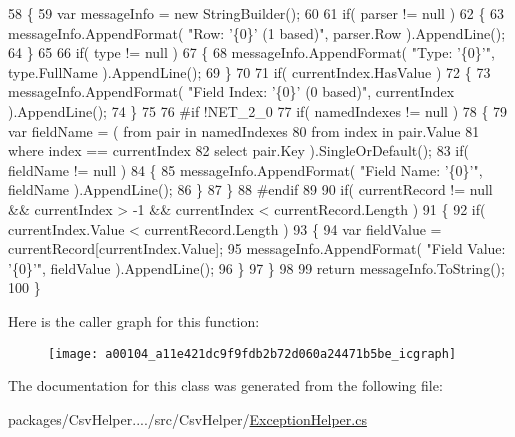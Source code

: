 \begin{DoxyCode}
58         \{
59             var messageInfo = \textcolor{keyword}{new} StringBuilder();
60 
61             \textcolor{keywordflow}{if}( parser != null )
62             \{
63                 messageInfo.AppendFormat( \textcolor{stringliteral}{"Row: '\{0\}' (1 based)"}, parser.Row ).AppendLine();
64             \}
65 
66             \textcolor{keywordflow}{if}( type != null )
67             \{
68                 messageInfo.AppendFormat( \textcolor{stringliteral}{"Type: '\{0\}'"}, type.FullName ).AppendLine();
69             \}
70 
71             \textcolor{keywordflow}{if}( currentIndex.HasValue )
72             \{
73                 messageInfo.AppendFormat( \textcolor{stringliteral}{"Field Index: '\{0\}' (0 based)"}, currentIndex ).AppendLine();
74             \}
75 
76 \textcolor{preprocessor}{#if !NET\_2\_0
}
77 \textcolor{preprocessor}{}            \textcolor{keywordflow}{if}( namedIndexes != null )
78             \{
79                 var fieldName = ( from pair in namedIndexes
80                                   from index in pair.Value
81                                   where index == currentIndex
82                                   select pair.Key ).SingleOrDefault();
83                 \textcolor{keywordflow}{if}( fieldName != null )
84                 \{
85                     messageInfo.AppendFormat( \textcolor{stringliteral}{"Field Name: '\{0\}'"}, fieldName ).AppendLine();
86                 \}
87             \}
88 \textcolor{preprocessor}{#endif
}
89 \textcolor{preprocessor}{}
90             \textcolor{keywordflow}{if}( currentRecord != null && currentIndex > -1 && currentIndex < currentRecord.Length )
91             \{
92                 \textcolor{keywordflow}{if}( currentIndex.Value < currentRecord.Length )
93                 \{
94                     var fieldValue = currentRecord[currentIndex.Value];
95                     messageInfo.AppendFormat( \textcolor{stringliteral}{"Field Value: '\{0\}'"}, fieldValue ).AppendLine();
96                 \}
97             \}
98 
99             \textcolor{keywordflow}{return} messageInfo.ToString();
100         \}
\end{DoxyCode}


Here is the caller graph for this function\-:
\nopagebreak
\begin{figure}[H]
\begin{center}
\leavevmode
\texttt{[image: a00104\_a11e421dc9f9fdb2b72d060a24471b5be\_icgraph]}
\end{center}
\end{figure}




The documentation for this class was generated from the following file\-:\begin{DoxyCompactItemize}
\item 
packages/\-Csv\-Helper..../src/\-Csv\-Helper/\hyperlink{a00247}{Exception\-Helper.\-cs}\end{DoxyCompactItemize}
